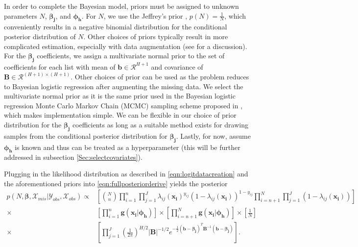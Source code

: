 \documentclass[
  12pt,
]{article}
\begin{document}
In order to complete the Bayesian model, priors must be assigned to
unknown parameters \(N\), \(\boldsymbol{\beta_j}\), and
\(\boldsymbol{\phi_h}\). For \(N\), we use the Jeffrey's prior
\citep{jeffreys_theory_1967}, \(p(N) = \frac{1}{N}\), which conveniently
results in a negative binomial distribution for the conditional
posterior distribution of \(N\). Other choices of priors typically
result in more complicated estimation, especially with data augmentation
(see \cite{king_capturerecapture_2016} for a discussion). For the
\(\boldsymbol{\beta_j}\) coefficients, we assign a multivariate normal
prior to the set of coefficients for each list with mean of
\(\boldsymbol{b}\in \mathcal{R}^{H+1}\) and covariance of
\(\boldsymbol{B}\in \mathcal{R}^{(H+1) \times (H+1)}\). Other choices of
prior can be used as the problem reduces to Bayesian logistic regression
after augmenting the missing data. We select the multivariate normal
prior as it is the same prior used in the Bayesian logistic regression
Monte Carlo Markov Chain (MCMC) sampling scheme proposed in
\citep{polson_bayesian_2013}, which makes implementation simple. We can
be flexible in our choice of prior distribution for the
\(\boldsymbol{\beta_j}\) coefficients as long as a suitable method
exists for drawing samples from the conditional posterior distribution
for \(\boldsymbol{\beta_j}\). Lastly, for now, assume
\(\boldsymbol{\phi_h}\) is known and thus can be treated as a
hyperparameter (this will be further addressed in subsection
\ref{Sec:selectcovariates}).

Plugging in the likelihood distribution as described in
\autoref{eqn:logitdatacreation} and the aforementioned priors into
\autoref{eqn:fullposteriorderive} yields the posterior \begin{align}
\label{eqn:fullposteriorderivevalues}
\nonumber p(N,\boldsymbol{\beta},\mathcal{X}_{mis}|\mathcal{Y}_{obs},\mathcal{X}_{obs}) \propto &  \left[\binom{N}{n}\prod_{i=1}^n \prod_{j=1}^J \lambda_{ij}(\boldsymbol{x_i})^{y_{ij}}(1-\lambda_{ij}(\boldsymbol{x_i}))^{1-y_{ij}}\prod_{i=n+1}^N \prod_{j=1}^J (1-\lambda_{ij}(\boldsymbol{x_i})) \right] \\
\nonumber \times & \left[ \prod_{i=1}^n \boldsymbol{g}(\boldsymbol{x_i}|\boldsymbol{\phi_h}) \right] \times \left[ \prod_{i=n+1}^N \boldsymbol{g}(\boldsymbol{x_i}|\boldsymbol{\phi_h}) \right] \times \left[\frac{1}{N}\right] \\
\times & \left[ \prod_{j=1}^J \left(\frac{1}{2\pi}\right)^{H/2}|\boldsymbol{B}|^{-1/2}e^{-\frac{1}{2}(\boldsymbol{b}-\boldsymbol{\beta_j})^T\boldsymbol{B}^{-1}(\boldsymbol{b}-\boldsymbol{\beta_j})}\right].
\end{align}
\end{document}

